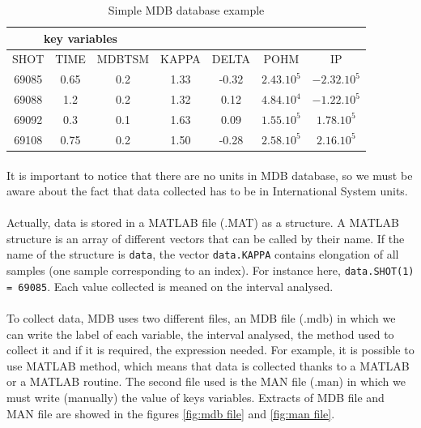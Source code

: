 \documentclass[12pt]{article}
\begin{document}
\begin{table}[h]
    \centering
    \begin{tabular}{|c|c|c|c|c|c|c|}
        \hline
        \multicolumn{3}{|c|}{key variables} & \multicolumn{4}{|c|}{}\\
        \hline
        SHOT & TIME & MDBTSM & KAPPA & DELTA & POHM & IP \\
        \hline
        69085 & 0.65 & 0.2 & 1.33 & -0.32  & \(2.43.10^5\) & \(-2.32.10^5\) \\
        69088 & 1.2 & 0.2 & 1.32 & 0.12 & \(4.84.10^4\) & \(-1.22.10^5\) \\
        69092 & 0.3 & 0.1 & 1.63 & 0.09 & \(1.55.10^5\) & \(1.78.10^5\) \\
        69108 & 0.75 & 0.2 & 1.50 & -0.28 & \(2.58.10^5\) & \(2.16.10^5\) \\
         \hline
         
    \end{tabular}
    \caption{Simple MDB database example}
    \label{tab:mdb example}
\end{table}

\paragraph{}
It is important to notice that there are no units in MDB database, so we must be aware about the fact that data collected has to be in International System units. 

\paragraph{}
Actually, data is stored in a MATLAB file (.MAT) as a structure. A MATLAB structure is an array of different vectors that can be called by their name. If the name of the structure is \texttt{data}, the vector \texttt{data.KAPPA} contains elongation of all samples (one sample corresponding to an index). For instance here, \texttt{data.SHOT(1) = 69085}. Each value collected is meaned on the interval analysed.

\paragraph{}
To collect data, MDB uses two different files, an MDB file (.mdb) in which we can write the label of each variable, the interval analysed, the method used to collect it and if it is required, the expression needed. For example, it is possible to use MATLAB method, which means that data is collected thanks to a MATLAB or a MATLAB routine. The second file used is the MAN file (.man) in which we must write (manually) the value of keys variables. Extracts of MDB file and MAN file are showed in the figures \ref{fig:mdb file} and \ref{fig:man file}.
\end{document}
